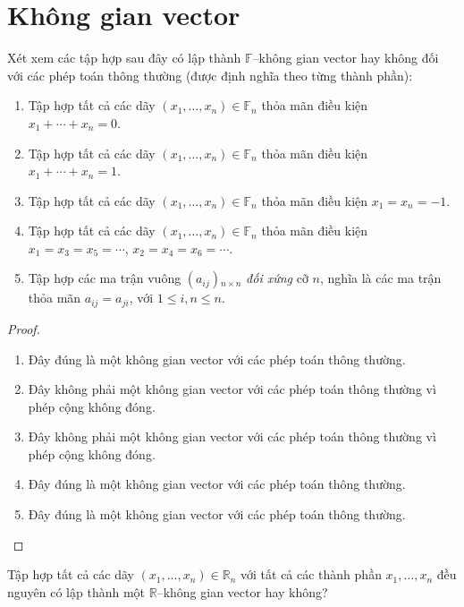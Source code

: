 \documentclass[class=linearalgebra,crop=false]{standalone}
\begin{document}
\chapter{Không gian vector}

\begin{exercise}Xét xem các tập hợp sau đây có lập thành $\mathbb{F}$--không gian vector hay không đối với các phép toán thông thường (được định nghĩa theo từng thành phần):
    \begin{enumerate}[itemsep=0pt,topsep=0pt,label = (\alph*)]
        \item Tập hợp tất cả các dãy $(x_{1},\ldots,x_{n})\in\mathbb{F}_{n}$ thỏa mãn điều kiện $x_{1} + \cdots + x_{n} = 0$.
        \item Tập hợp tất cả các dãy $(x_{1},\ldots,x_{n})\in\mathbb{F}_{n}$ thỏa mãn điều kiện $x_{1} + \cdots + x_{n} = 1$.
        \item Tập hợp tất cả các dãy $(x_{1},\ldots,x_{n})\in\mathbb{F}_{n}$ thỏa mãn điều kiện $x_{1} = x_{n} = -1$.
        \item Tập hợp tất cả các dãy $(x_{1},\ldots,x_{n})\in\mathbb{F}_{n}$ thỏa mãn điều kiện $x_{1} = x_{3} = x_{5} = \cdots$, $x_{2} = x_{4} = x_{6} = \cdots$.
        \item Tập hợp các ma trận vuông $(a_{ij}){}_{n\times n}$ \textit{đối xứng} cỡ $n$, nghĩa là các ma trận thỏa mãn $a_{ij} = a_{ji}$, với $1\le i, n\le n$.
    \end{enumerate}
\end{exercise}

\begin{proof}
    \begin{enumerate}[label = (\alph*)]
        \item Đây đúng là một không gian vector với các phép toán thông thường.
        \item Đây không phải một không gian vector với các phép toán thông thường vì phép cộng không đóng.
        \item Đây không phải một không gian vector với các phép toán thông thường vì phép cộng không đóng.
        \item Đây đúng là một không gian vector với các phép toán thông thường.
        \item Đây đúng là một không gian vector với các phép toán thông thường.
    \end{enumerate}
\end{proof}

\begin{exercise}Tập hợp tất cả các dãy $(x_{1},\ldots, x_{n})\in\mathbb{R}_{n}$ với tất cả các thành phần $x_{1}, \ldots, x_{n}$ đều nguyên có lập thành một $\mathbb{R}$--không gian vector hay không?
\end{exercise}
\end{document}

